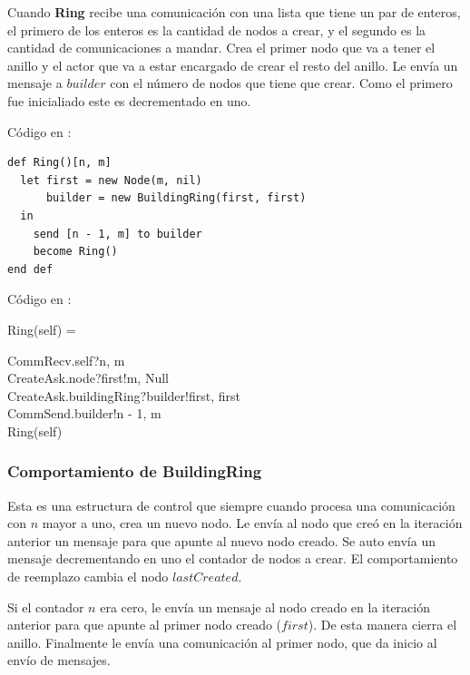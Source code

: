 Cuando \textbf{Ring} recibe una comunicación con una lista que tiene un par de enteros, el primero de los enteros es la cantidad de nodos a crear, y el segundo es la cantidad de comunicaciones a mandar. Crea el primer nodo que va a tener el anillo y el actor que va a estar encargado de crear el resto del anillo. Le envía un mensaje a $builder$ con el número de nodos que tiene que crear. Como el primero fue inicialiado este es decrementado en uno.

Código en \SAL:

\begin{lstlisting}[language=sal, style=simple]
def Ring()[n, m]
  let first = new Node(m, nil)
      builder = new BuildingRing(first, first) 
  in
    send [n - 1, m] to builder
    become Ring() 
end def
\end{lstlisting}

Código en \CSP:

\begin{process}
Ring(self) = \\ \quad
  \begin{block}
  CommRecv.self?\langle n, m \rangle \then \\
  CreateAsk.node?first!\langle m, Null \rangle \then \\
  CreateAsk.buildingRing?builder!\langle first, first \rangle \then \\
  CommSend.builder!\langle n - 1, m\rangle \then \\
  Ring(self)
  \end{block}
\end{process}

\subsubsection*{Comportamiento de BuildingRing}

Esta es una estructura de control que siempre cuando procesa una comunicación con $n$ mayor a uno, crea un nuevo nodo. Le envía al nodo que creó en la iteración anterior un mensaje para que apunte al nuevo nodo creado. Se auto envía un mensaje decrementando en uno el contador de nodos a crear. El comportamiento de reemplazo cambia el nodo $lastCreated$.

Si el contador $n$ era cero, le envía un mensaje al nodo creado en la iteración anterior para que apunte al primer nodo creado ($first$). De esta manera cierra el anillo. Finalmente le envía una comunicación al primer nodo, que da inicio al envío de mensajes. 

